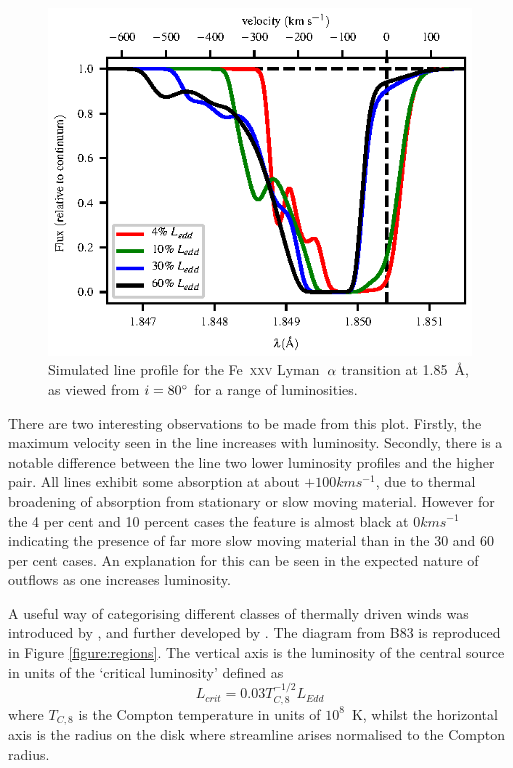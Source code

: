 \documentclass[a4paper,fleqn,usenatbib]{mnras}
\begin{document}
\begin{figure}
\includegraphics[width=\columnwidth]{figures/80_degrees_fe25.eps}
\caption{Simulated line profile for the Fe~\textsc{xxv} Lyman~$\rm{\alpha}$
transition at 1.85~{\AA}, as viewed from $i = 80\degree$ for a range
of luminosities.}
\label{figure:line25}
\end{figure}

There are two interesting observations to be made from this plot. Firstly, the maximum velocity seen in 
the line increases with luminosity. Secondly, there is a notable difference between the line two lower luminosity 
profiles and the higher pair. All lines exhibit some absorption at about $+100kms^{-1}$, due to thermal 
broadening of absorption from stationary or slow moving material. However for the 4 per cent and 10 percent 
cases the feature is almost black at $0kms^{-1}$ indicating the presence of far more slow moving material than 
in the 30 and 60 per cent cases. An explanation for this can be seen in the expected nature of outflows as one 
increases luminosity. 

A useful way of categorising different classes of thermally driven winds was introduced 
by \cite[hereafter B83]{1983ApJ...271...70B}, and further developed by \cite[hereafter W96]{1996ApJ...461..767W}. The
diagram from B83 is reproduced in Figure  \ref{figure:regions}. The vertical axis is the luminosity of the central
source in units of the `critical luminosity' defined as
\begin{equation}
L_{crit}=0.03T_{C,8}^{-1/2}L_{Edd}
\label{L_crit}
\end{equation}
where $T_{C,8}$ is the Compton temperature in units of $10^8$~K,
whilst the horizontal axis is the radius on the disk where streamline arises normalised to the Compton radius. 
\end{document}
